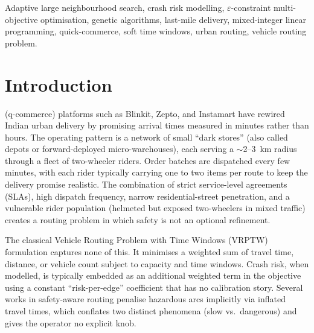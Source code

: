 \documentclass{ieeeaccess}
\begin{document}
\begin{keywords}
Adaptive large neighbourhood search,
crash risk modelling,
$\varepsilon$-constraint multi-objective optimisation,
genetic algorithms,
last-mile delivery,
mixed-integer linear programming,
quick-commerce,
soft time windows,
urban routing,
vehicle routing problem.
\end{keywords}

\titlepgskip=-21pt

\maketitle

\section{Introduction}
\label{sec:introduction}
 (q-commerce) platforms such as Blinkit,
Zepto, and Instamart have rewired Indian urban delivery by promising
arrival times measured in minutes rather than hours. The operating
pattern is a network of small ``dark stores'' (also called depots or
forward-deployed micro-warehouses), each serving a $\sim$2--3~km radius
through a fleet of two-wheeler riders. Order batches are dispatched
every few minutes, with each rider typically carrying one to two
items per route to keep the delivery promise realistic. The combination
of strict service-level agreements (SLAs), high dispatch frequency,
narrow residential-street penetration, and a vulnerable rider
population (helmeted but exposed two-wheelers in mixed traffic) creates
a routing problem in which safety is not an optional refinement.

The classical Vehicle Routing Problem with Time Windows (VRPTW)
formulation captures none of this. It minimises a weighted sum of
travel time, distance, or vehicle count subject to capacity and time
windows. Crash risk, when modelled, is typically embedded as an
additional weighted term in the objective using a constant
``risk-per-edge'' coefficient that has no calibration story. Several
works in safety-aware routing penalise hazardous arcs implicitly via
inflated travel times, which conflates two distinct phenomena
(slow vs.\ dangerous) and gives the operator no explicit knob.
\end{document}
